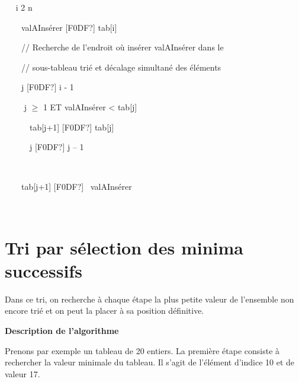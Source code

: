 {\sffamily
\ \  i  2  n
}

{\sffamily
\ \ \ \ valAInsérer {\textrm{[F0DF?]}} tab[i]}

{\sffamily
\ \ \ \ // Recherche de l’endroit où insérer valAInsérer dans le }

{\sffamily
\ \ \ \ // sous-tableau trié et décalage simultané des éléments}

{\sffamily
\ \ \ \ j \textrm{[F0DF?]} i - 1}

{\sffamily
\ \ \ \   j ${\geq}$ 1 ET
valAInsérer {\textless} tab[j] }

{\sffamily
\ \ \ \ \ \ {tab[j+1]
}\textrm{[F0DF?]}{ tab[j]}}

{\sffamily
{\ \ \ \ \ \ j
}\textrm{[F0DF?]}{ j – 1}}

{\sffamily
{\ \ \ \ }
 }

{\sffamily
\ \ \ \ tab[j+1] \textrm{[F0DF?]} \ valAInsérer}

{\sffamily
\ \  }


\bigskip

{\sffamily
{} }


\bigskip

\section{Tri par sélection des minima successifs}
{
Dans ce tri, on recherche à chaque étape la plus petite valeur de
l’ensemble non encore trié et on peut la placer à sa position
définitive.}

{\sffamily\bfseries\upshape
Description de l’algorithme}

{
Prenons par exemple un tableau de 20 entiers. La première étape consiste
à rechercher la valeur minimale du tableau. Il s’agit de l’élément
d’indice 10 et de valeur 17.}

